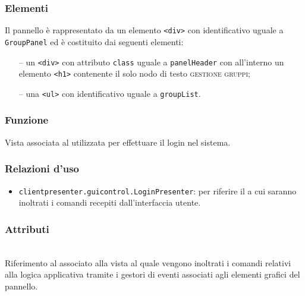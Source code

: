 \subsubsection*{Elementi}
Il pannello è rappresentato da un elemento \verb'<div>' con identificativo uguale a \verb'GroupPanel' ed è costituito dai seguenti elementi:
\begin{itemize}
  \item[--] un \verb'<div>' con attributo \verb'class' uguale a \verb'panelHeader' con all'interno un elemento \verb'<h1>' contenente il solo nodo di testo \textsc{gestione gruppi};
  \item[--] una \verb'<ul>' con identificativo uguale a \verb'groupList'.
\end{itemize}


\subsubsection*{Funzione}
Vista associata al   utilizzata per effettuare il login nel sistema.

\subsubsection*{Relazioni d'uso}
\begin{itemize}
  \item \texttt{clientpresenter.guicontrol.LoginPresenter}: per riferire il  a cui saranno inoltrati i comandi recepiti dall'interfaccia utente.
\end{itemize}

\subsubsection*{Attributi}
\begin{description}
  \item{}\\
  Riferimento al  associato alla vista al quale vengono inoltrati i comandi relativi alla logica applicativa tramite i gestori di eventi associati agli elementi grafici del pannello.
\end{description}

